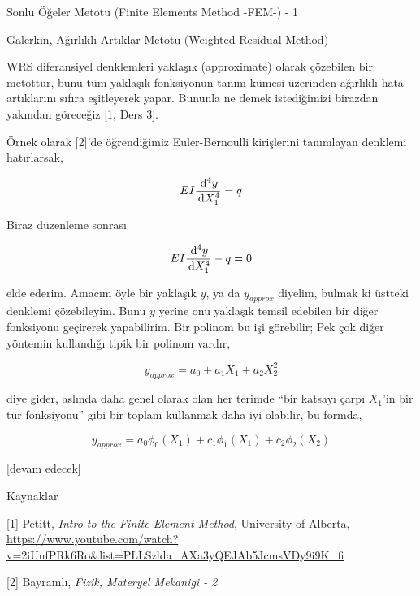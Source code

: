 \documentclass[12pt,fleqn]{article}\usepackage{../../common}
\begin{document}
Sonlu Öğeler Metotu (Finite Elements Method -FEM-) - 1

Galerkin, Ağırlıklı Artıklar Metotu (Weighted Residual Method)

WRS diferansiyel denklemleri yaklaşık (approximate) olarak çözebilen bir
metottur, bunu tüm yaklaşık fonksiyonun tanım kümesi üzerinden ağırlıklı hata
artıklarını sıfıra eşitleyerek yapar. Bununla ne demek istediğimizi birazdan
yakından göreceğiz [1, Ders 3].

Örnek olarak [2]'de öğrendiğimiz Euler-Bernoulli kirişlerini tanımlayan denklemi
hatırlarsak,

$$
E I \frac{\,\mathrm{d}^4 y}{\,\mathrm{d} X_1^4} = q
$$

Biraz düzenleme sonrası

$$
E I \frac{\,\mathrm{d}^4 y}{\,\mathrm{d} X_1^4} - q = 0
$$

elde ederim. Amacım öyle bir yaklaşık $y$, ya da $y_{approx}$ diyelim, bulmak ki
üstteki denklemi çözebileyim. Bunu $y$ yerine onu yaklaşık temsil edebilen bir
diğer fonksiyonu geçirerek yapabilirim. Bir polinom bu işi görebilir; Pek çok
diğer yöntemin kullandığı tipik bir polinom vardır,

$$
y_{approx} = a_0 + a_1 X_1 + a_2 X_2^2 
$$

diye gider, aslında daha genel olarak olan her terimde ``bir katsayı çarpı
$X_1$'in bir tür fonksiyonu'' gibi bir toplam kullanmak daha iyi olabilir,
bu formda,

$$
y_{approx} = a_0 \phi_0(X_1) + c_1 \phi_1(X_1) + c_2 \phi_2(X_2) 
$$












[devam edecek]

Kaynaklar

[1] Petitt, {\em Intro to the Finite Element Method}, University of Alberta,
    \url{https://www.youtube.com/watch?v=2iUnfPRk6Ro&list=PLLSzlda_AXa3yQEJAb5JcmsVDy9i9K_fi}

[2] Bayramlı, {\em Fizik, Materyel Mekanigi - 2}
    
\end{document}

